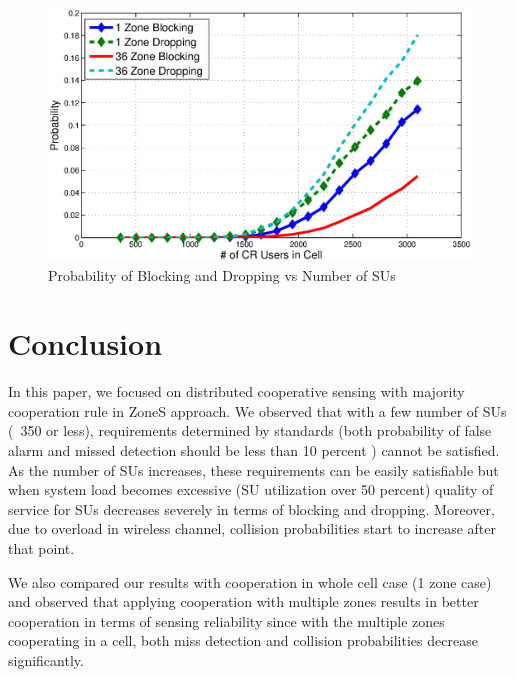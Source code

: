 \documentclass[conference,compsoc]{IEEEtran}
\begin{document}
\begin{figure}[t]
\centering
\includegraphics[width=0.99\columnwidth,keepaspectratio] {figs/pb_d.eps}
\caption{Probability of Blocking and Dropping vs Number of SUs}
\label{fig:probb}
\end{figure}

\section{\label{sec:conclusion}Conclusion}
In this paper, we focused on distributed cooperative sensing with majority cooperation rule in ZoneS approach. We observed that with a few number of SUs (~350 or less), requirements determined by standards (both probability of false alarm and missed detection should be less than 10 percent \cite{wranstandard}) cannot be satisfied. As the number of SUs increases, these requirements can be easily satisfiable but when system load becomes excessive (SU utilization over 50 percent) quality of service for SUs decreases severely in terms of blocking and dropping. Moreover, due to overload in wireless channel, collision probabilities start to increase after that point.

We also compared our results with cooperation in whole cell case (1 zone case) and observed that applying cooperation with multiple zones results in better cooperation in terms of sensing reliability since with the multiple zones cooperating in a cell, both miss detection and collision probabilities decrease significantly.
\end{document}

